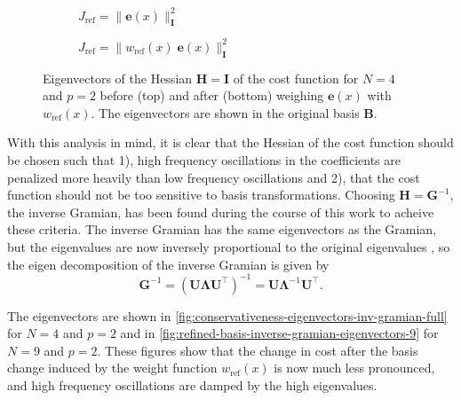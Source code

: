     
\begin{figure}
    \centering
    \begin{subfigure}[t]{\textwidth}
        \centering
        
        \caption{$J_\text{ref} = \|\mathbf e(x)\|_\mathbf I^2$}
        \label{fig:conservativeness-eigenvectors-coeffs-unrefined}
    \end{subfigure}
    \begin{subfigure}[t]{\textwidth}
        \centering
        
        \caption{$J_\text{ref} = \|w_\text{ref}(x)\;\mathbf e(x)\|_\mathbf I^2$}
        \label{fig:conservativeness-eigenvectors-weight-refined}
    \end{subfigure}
    \caption{Eigenvectors of the Hessian $\mathbf H = \mathbf I$ of the cost function for $N=4$ and $p=2$ before (top) and after (bottom) weighing $\mathbf e(x)$ with $w_\text{ref}(x)$. The eigenvectors are shown in the original basis $\mathbf B$.}
    \label{fig:conservativeness-eigenvectors-full}
\end{figure}

With this analysis in mind, it is clear that the Hessian of the cost function should be chosen such that 1), high frequency oscillations in the coefficients are penalized more heavily than low frequency oscillations and 2), that the cost function should not be too sensitive to basis transformations. Choosing $\mathbf H = \mathbf G^{-1}$, the inverse Gramian, has been found during the course of this work to acheive these criteria. The inverse Gramian has the same eigenvectors as the Gramian, but the eigenvalues are now inversely proportional to the original eigenvalues \citep{horn2013positive}, so the eigen decomposition of the inverse Gramian is given by
\begin{equation}
    \mathbf G^{-1} = \left(\mathbf U \mathbf \Lambda \mathbf U^\top\right)^{-1} = \mathbf U \mathbf \Lambda^{-1} \mathbf U^\top.
\end{equation}

The eigenvectors are shown in \cref{fig:conservativeness-eigenvectors-inv-gramian-full} for $N=4$ and $p=2$ and in \cref{fig:refined-basis-inverse-gramian-eigenvectors-9} for $N=9$ and $p=2$. These figures show that the change in cost after the basis change induced by the weight function $w_\text{ref}(x)$ is now much less pronounced, and high frequency oscillations are damped by the high eigenvalues. 

